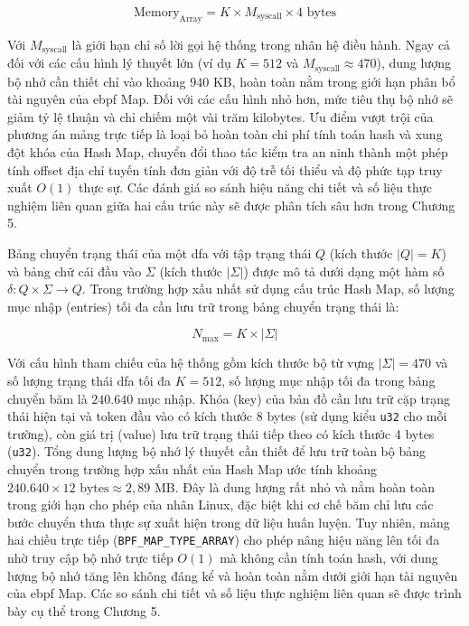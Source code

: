 \documentclass[../main.tex]{subfiles}
\begin{document}
\begin{equation}
  \label{eq:memory_direct_array}
  \text{Memory}_{\text{Array}} = K \times M_{\text{syscall}} \times 4
  \text{ bytes}
\end{equation}

Với $M_{\text{syscall}}$ là giới hạn chỉ số lời gọi hệ thống trong
nhân hệ điều hành. Ngay cả đối với các cấu hình lý thuyết lớn (ví dụ
$K = 512$ và $M_{\text{syscall}} \approx 470$), dung lượng bộ nhớ cần
thiết chỉ vào khoảng $940$ KB, hoàn toàn nằm trong giới hạn phân bổ
tài nguyên của \gls{ebpf} Map. Đối với các cấu hình nhỏ hơn, mức tiêu thụ
bộ nhớ sẽ giảm tỷ lệ thuận và chỉ chiếm một vài trăm kilobytes. Ưu
điểm vượt trội của phương án mảng trực tiếp là loại bỏ hoàn toàn chi
phí tính toán hash và xung đột khóa của Hash Map, chuyển đổi thao tác
kiểm tra an ninh thành một phép tính offset địa chỉ tuyến tính đơn
giản với độ trễ tối thiểu và độ phức tạp truy xuất $O(1)$ thực sự.
Các đánh giá so sánh hiệu năng chi tiết và số liệu thực nghiệm liên
quan giữa hai cấu trúc này sẽ được phân tích sâu hơn trong Chương 5.

Bảng chuyển trạng thái của một \gls{dfa} với tập trạng thái $Q$ (kích thước
$|Q| = K$) và bảng chữ cái đầu vào $\Sigma$ (kích thước $|\Sigma|$)
được mô tả dưới dạng một hàm số $\delta: Q \times \Sigma \to Q$.
Trong trường hợp xấu nhất sử dụng cấu trúc Hash Map, số lượng mục
nhập (entries) tối đa cần lưu trữ trong bảng chuyển trạng thái là:

\begin{equation}
  \label{eq:max_entries}
  N_{\text{max}} = K \times |\Sigma|
\end{equation}

Với cấu hình tham chiếu của hệ thống gồm kích thước bộ từ vựng
$|\Sigma| = 470$ và số lượng trạng thái \gls{dfa} tối đa $K = 512$, số
lượng mục nhập tối đa trong bảng chuyển băm là $240.640$ mục nhập.
Khóa (key) của bản đồ cần lưu trữ cặp trạng thái hiện tại và token
đầu vào có kích thước 8 bytes (sử dụng kiểu \texttt{u32} cho mỗi
trường), còn giá trị (value) lưu trữ trạng thái tiếp theo có kích
thước 4 bytes (\texttt{u32}). Tổng dung lượng bộ nhớ lý thuyết cần
thiết để lưu trữ toàn bộ bảng chuyển trong trường hợp xấu nhất của
Hash Map ước tính khoảng $240.640 \times 12 \text{ bytes} \approx
2,89$ MB. Đây là dung lượng rất nhỏ và nằm hoàn toàn trong giới hạn
cho phép của nhân Linux, đặc biệt khi cơ chế băm chỉ lưu các bước
chuyển thưa thực sự xuất hiện trong dữ liệu huấn luyện. Tuy nhiên,
mảng hai chiều trực tiếp (\texttt{BPF\_MAP\_TYPE\_ARRAY}) cho phép
nâng hiệu năng lên tối đa nhờ truy cập bộ nhớ trực tiếp $O(1)$ mà
không cần tính toán hash, với dung lượng bộ nhớ tăng lên không đáng
kể và hoàn toàn nằm dưới giới hạn tài nguyên của \gls{ebpf} Map. Các so
sánh chi tiết và số liệu thực nghiệm liên quan sẽ được trình bày cụ
thể trong Chương 5.
\end{document}
